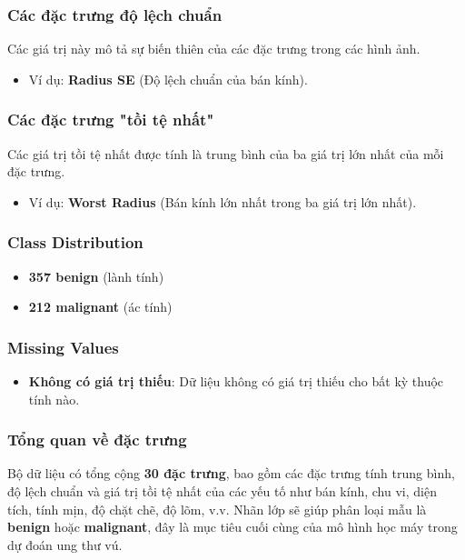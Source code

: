 \subsubsection*{Các đặc trưng độ lệch chuẩn}
Các giá trị này mô tả sự biến thiên của các đặc trưng trong các hình ảnh.
\begin{itemize}
    \item Ví dụ: \textbf{Radius SE} (Độ lệch chuẩn của bán kính).
\end{itemize}

\subsubsection*{Các đặc trưng "tồi tệ nhất"}
Các giá trị tồi tệ nhất được tính là trung bình của ba giá trị lớn nhất của mỗi đặc trưng.
\begin{itemize}
    \item Ví dụ: \textbf{Worst Radius} (Bán kính lớn nhất trong ba giá trị lớn nhất).
\end{itemize}

\subsubsection*{Class Distribution}
\begin{itemize}
    \item \textbf{357 benign} (lành tính)
    \item \textbf{212 malignant} (ác tính)
\end{itemize}

\subsubsection*{Missing Values}
\begin{itemize}
    \item \textbf{Không có giá trị thiếu}: Dữ liệu không có giá trị thiếu cho bất kỳ thuộc tính nào.
\end{itemize}

\subsubsection*{Tổng quan về đặc trưng}
Bộ dữ liệu có tổng cộng \textbf{30 đặc trưng}, bao gồm các đặc trưng tính trung bình, độ lệch chuẩn và giá trị tồi tệ nhất của các yếu tố như bán kính, chu vi, diện tích, tính mịn, độ chặt chẽ, độ lõm, v.v. Nhãn lớp sẽ giúp phân loại mẫu là \textbf{benign} hoặc \textbf{malignant}, đây là mục tiêu cuối cùng của mô hình học máy trong dự đoán ung thư vú.
